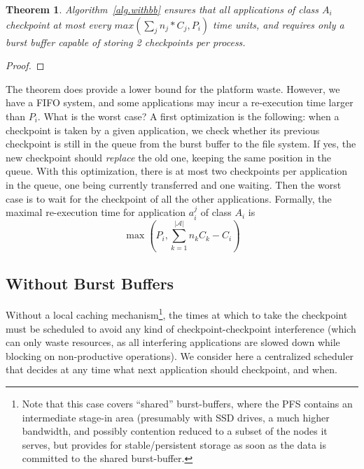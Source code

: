 \documentclass{article}
\newtheorem{theorem}{Theorem}
\newcommand{\nbapps}{|{\mathcal A}|}
\newcommand{\app}[1]{A_{#1}}
\newcommand{\application}[2]{a_{#1}^{#2}}
\newcommand{\nbapp}[1]{n_{#1}}
\newcommand{\period}[1]{P_{#1}}
\newcommand{\ckpt}[1]{C_{#1}}
\begin{document}
\begin{theorem}
  Algorithm~\ref{alg.withbb} ensures that all applications of class $\app{i}$
  checkpoint at most every $max(\sum_j\nbapp{j}*\ckpt{j}, \period{i})$
  time units, and requires only a burst buffer capable of storing 2
  checkpoints per process.
\end{theorem}

\begin{proof}
  \todo{This derives from $\sum_i \frac{\ckpt{i}}{\period{i}} \leq 1$,
    but should be done properly.}
\end{proof}
    
The theorem does provide a lower bound for the platform waste.
However, we have a FIFO system, and some applications may incur
a re-execution time larger than $P_{i}$. What is the worst case?
A first optimization is the following: when a checkpoint is taken
    by a given application, we check whether its previous checkpoint is
    still in the queue from the burst buffer to the file system. If yes, the new
checkpoint should \emph{replace} the old one, keeping the same position in the queue.
With this optimization, there is at most two checkpoints per application in the queue,
one being currently transferred and one waiting.
Then the worst case is to wait for the checkpoint of all the other applications.
Formally, the maximal re-execution time for application
$\application{i}{j}$ of class
$\app{i}$ is
$$\max(P_{i}, \sum_{k=1}^{\nbapps} n_{k}C_{k} - C_{i})$$


\subsection{Without Burst Buffers}

Without a local caching mechanism\footnote{Note that this case covers ``shared'' burst-buffers, where the 
PFS contains an intermediate stage-in area (presumably with SSD drives, a much higher bandwidth, and possibly contention reduced to a subset of the nodes it serves, but provides for stable/persistent storage as soon as the data is committed to the shared burst-buffer.}, the times at which to take the checkpoint
must be scheduled to avoid any kind of checkpoint-checkpoint
interference (which can only waste resources, as all interfering
applications are slowed down while blocking on non-productive
operations). We consider here a centralized scheduler that decides at
any time what next application should checkpoint, and when.
\end{document}
